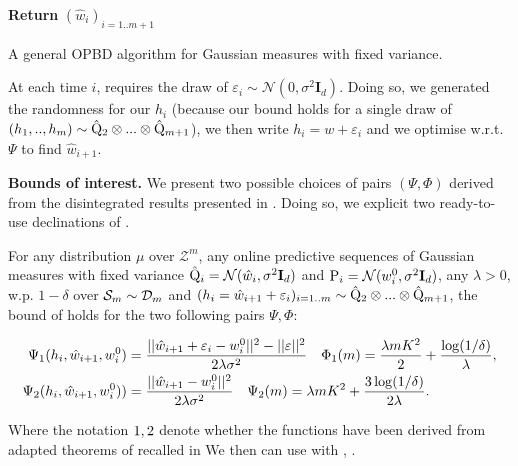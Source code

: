 \begin{algorithm}[ht]
 \SetAlgoLined
\textbf{Return} $(\hat{w}_i)_{i=1..m+1}$
 \caption{A general OPBD algorithm for Gaussian measures with fixed variance.}
 \label{alg: OPBD_alg}
 \end{algorithm}

At each time $i$,  requires the draw of $\varepsilon_i\sim\mathcal{N}(0,\sigma^2 \mathbf{I}_d)$. Doing so, we generated the randomness for our $h_i$ (because our bound holds for a single draw of $(h_1,..,h_m)\sim \hat{\Q}_2\otimes...\otimes \hat{\Q}_{m+1}$), we then write $h_i= w + \varepsilon_i$
and we optimise w.r.t. $\Psi$ to find $\hat{w}_{i+1}$.

\textbf{Bounds of interest.} We present two possible choices of pairs $(\Psi,\Phi)$ derived from the disintegrated results presented in . Doing so, we explicit two ready-to-use declinations of .

\begin{corollary}
  \label{cor: OPBD_optim_funcs}
  For any distribution $\mu$ over $\mathcal{Z}^m$, any online predictive sequences of Gaussian measures with fixed variance $\hat{\Q}_i= \mathcal{N}(\hat{w}_i, \sigma^2\mathbf{I}_d)$ and $\P_{i}= \mathcal{N}(w_i^0,\sigma^2\mathbf{I}_d)$, any $\lambda>0$, w.p. $1-\delta$ over $\Sm\sim\Dm$ and $(h_i=\hat{w}_{i+1} + \varepsilon_i)_{i=1..m}\sim \hat{\Q}_2\otimes...\otimes \hat{\Q}_{m+1}$,
  the bound of  holds for the two following pairs $\Psi,\Phi$:

\begin{align}
  \label{eq: rivasplata_OPBD}
     \Psi_{\normalfont1}(h_i,\hat{w}_{i+1}, w_i^0) & = \frac{||\hat{w}_{i+1} + \varepsilon_i- w_i^0||^2 - ||\varepsilon||^2}{2\lambda\sigma^2}  \quad \Phi_{\normalfont1}(m) = \frac{\lambda m K^2}{2} + \frac{\log(1/\delta)}{\lambda},\\
    \label{eq: viallard_OPBD}
    \Psi_{\normalfont2}(h_i, \hat{w}_{i+1}, w_i^0)) &  = \frac{||\hat{w}_{i+1}-w_i^0||^2}{2\lambda\sigma^2} \quad \Psi_{\normalfont2}(m) = \lambda m K^2 + \frac{3\log(1/\delta)}{2\lambda}.
  \end{align}

  Where the notation $\normalfont1, \normalfont2$ denote whether the functions have been derived from adapted theorems of \citealp{rivasplata2020pac,viallard2023general} recalled in 
  We then can use  with  , .

\end{corollary}

